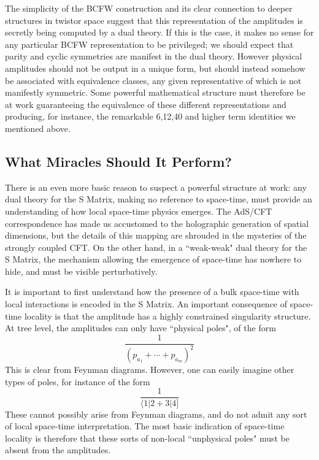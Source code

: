 \documentclass[12pt]{article}
\begin{document}
The simplicity of the BCFW construction and its clear connection to deeper structures in twistor space suggest that this representation of the amplitudes is secretly being computed by a dual theory. If this is the case, it makes no sense for any particular BCFW representation to be privileged; we should expect that parity and cyclic symmetries are manifest in the dual theory. However physical amplitudes should not be output in a unique form, but should instead somehow be associated with equivalence classes, any given representative of which is not manifestly symmetric. Some powerful mathematical structure must therefore be at work
guaranteeing the equivalence of these different representations and
producing, for instance, the remarkable 6,12,40 and higher term identities we mentioned above.

\subsection{What Miracles Should It Perform?}

There is an even more basic reason to suspect a powerful structure at work: any dual theory for the S Matrix, making no reference to space-time, must provide an understanding of how local space-time physics  emerges. The AdS/CFT correspondence \cite{adscft} has made us accustomed to the holographic generation of spatial dimensions, but the details of this mapping are shrouded in the mysteries of the strongly coupled CFT. On the other hand, in a ``weak-weak" dual theory for the S Matrix, the mechanism allowing the emergence of space-time has nowhere to hide, and must be visible perturbatively.

It is important to first understand how the presence of a bulk space-time with local interactions is encoded in the S Matrix. An important consequence of space-time locality is that the amplitude has a highly constrained singularity structure. At tree level, the amplitudes can only have ``physical poles", of the form
\begin{equation}
\frac{1}{(p_{a_1} + \cdots + p_{a_m})^2}
\end{equation}
This is clear from Feynman diagrams. However, one can easily
imagine other types of poles, for instance of the form
\begin{equation}
\label{spurious}
\frac{1}{\langle 1 | 2 + 3 |4]}
\end{equation}
These cannot possibly arise from Feynman diagrams, and  do
not admit any sort of local space-time interpretation. The most basic indication of space-time locality is therefore that these sorts of non-local ``unphysical poles" must be absent from the amplitudes.
\end{document}
